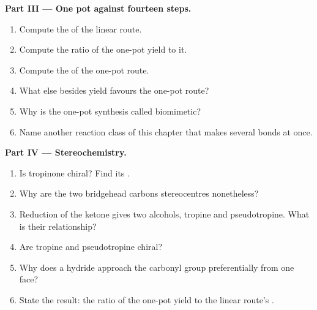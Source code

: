 \begin{problem}
\medskip\noindent\textbf{Part III --- One pot against fourteen steps.}
\begin{enumerate}[resume]
  \item Compute the  of the linear route.
  \item Compute the ratio of the one-pot yield to it.
  \item Compute the  of the one-pot route.
  \item What else besides yield favours the one-pot route?
  \item Why is the one-pot synthesis called biomimetic?
  \item Name another reaction class of this chapter that makes several bonds at once.
\end{enumerate}

\medskip\noindent\textbf{Part IV --- Stereochemistry.}
\begin{enumerate}[resume]
  \item Is tropinone chiral? Find its .
  \item Why are the two bridgehead carbons stereocentres nonetheless?
  \item Reduction of the ketone gives two alcohols, tropine and pseudotropine. What
        is their relationship?
  \item Are tropine and pseudotropine chiral?
  \item Why does a hydride approach the carbonyl group preferentially from one face?
  \item State the result: the ratio of the one-pot yield to the linear route's
        .
\end{enumerate}
\end{problem}
